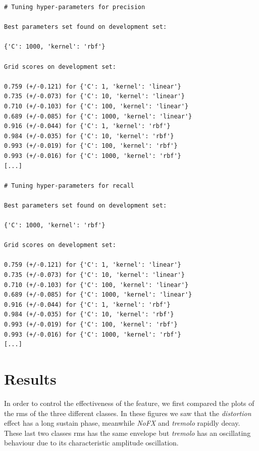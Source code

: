 \documentclass{article}
\begin{document}
\begin{verbatim}
# Tuning hyper-parameters for precision

Best parameters set found on development set:

{'C': 1000, 'kernel': 'rbf'}

Grid scores on development set:

0.759 (+/-0.121) for {'C': 1, 'kernel': 'linear'}
0.735 (+/-0.073) for {'C': 10, 'kernel': 'linear'}
0.710 (+/-0.103) for {'C': 100, 'kernel': 'linear'}
0.689 (+/-0.085) for {'C': 1000, 'kernel': 'linear'}
0.916 (+/-0.044) for {'C': 1, 'kernel': 'rbf'}
0.984 (+/-0.035) for {'C': 10, 'kernel': 'rbf'}
0.993 (+/-0.019) for {'C': 100, 'kernel': 'rbf'}
0.993 (+/-0.016) for {'C': 1000, 'kernel': 'rbf'}
[...]

# Tuning hyper-parameters for recall

Best parameters set found on development set:

{'C': 1000, 'kernel': 'rbf'}

Grid scores on development set:

0.759 (+/-0.121) for {'C': 1, 'kernel': 'linear'}
0.735 (+/-0.073) for {'C': 10, 'kernel': 'linear'}
0.710 (+/-0.103) for {'C': 100, 'kernel': 'linear'}
0.689 (+/-0.085) for {'C': 1000, 'kernel': 'linear'}
0.916 (+/-0.044) for {'C': 1, 'kernel': 'rbf'}
0.984 (+/-0.035) for {'C': 10, 'kernel': 'rbf'}
0.993 (+/-0.019) for {'C': 100, 'kernel': 'rbf'}
0.993 (+/-0.016) for {'C': 1000, 'kernel': 'rbf'}
[...]
\end{verbatim}
\newpage
\section{Results}
In order to control the effectiveness of the feature, we first compared the plots of the rms of the three different classes. In these figures we saw that the \emph{distortion} effect has a long sustain phase, meanwhile \emph{NoFX} and \emph{tremolo} rapidly decay. These last two classes rms has the same envelope but \emph{tremolo} has an oscillating behaviour due to its characteristic amplitude oscillation.\\
\end{document}
